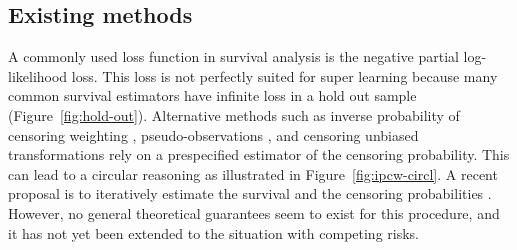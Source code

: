 \documentclass[a0,portrait]{a0poster}
\newcommand{\1}{\mathds{1}}
\begin{document}
\begin{minipage}{\textwidth}
\begin{minipage}[t]{1\linewidth}
\begin{multicols}{2}




\vspace{-2em}

\section*{Existing methods}

A commonly used loss function in survival analysis is the negative partial
log-likelihood loss. This loss is not perfectly suited for super learning
because many common survival estimators have infinite loss in a hold out sample
(Figure~\ref{fig:hold-out}). Alternative methods such as inverse probability of
censoring weighting \cite{graf1999assessment,gonzalez2021stacked},
pseudo-observations \cite{andersen2003generalised,sachs2019ensemble}, and
censoring unbiased transformations \cite{steingrimsson2019censoring} rely on a
prespecified estimator of the censoring probability. This can lead to a circular
reasoning as illustrated in Figure~\ref{fig:ipcw-circl}. A recent proposal is to
iteratively estimate the survival and the censoring probabilities
\cite{westling2021inference}. However, no general theoretical guarantees seem to
exist for this procedure, and it has not yet been extended to the situation with
competing risks.



\end{multicols}
\end{minipage}
\end{minipage}
\end{document}
